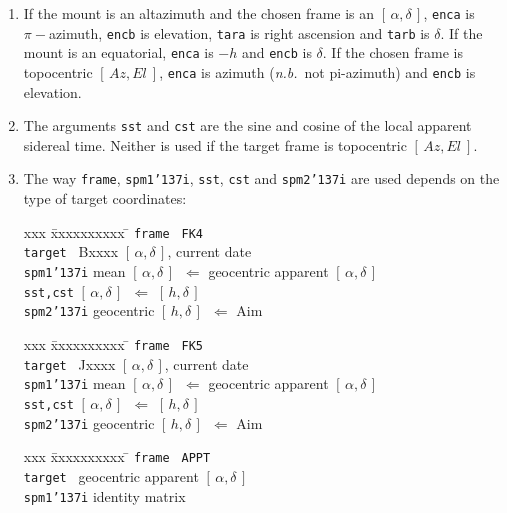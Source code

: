 \documentclass[12pt,fleqn,twoside]{article}
\renewcommand{\_}{{\tt\char'137}}     %
\newcommand{\radec}     {$[\,\alpha,\delta\,]$}
\newcommand{\hadec}     {$[\,h,\delta\,]$}
\newcommand{\azel}      {$[\,Az,El~]$}
\begin{document}
{\begin{enumerate}
      In the present case, the sky coordinates are predicted, starting
      from the mount's encoder readings.
\item If the mount is an altazimuth and the chosen frame is an
      \radec, {\tt enca} is $\pi-$azimuth, {\tt encb} is
      elevation, {\tt tara} is right
      ascension and {\tt tarb} is $\delta$.  If the mount is an
      equatorial, {\tt enca} is $-h$ and {\tt encb} is
      $\delta$.  If the chosen
      frame is topocentric \azel, {\tt enca} is azimuth
      ({\it n.b.}~not pi-azimuth) and {\tt encb} is elevation.
\item The arguments {\tt sst} and {\tt cst} are the
      sine and cosine of the local
      apparent sidereal time.  Neither is used if the target frame is
      topocentric \azel.
\item The way {\tt frame}, {\tt spm1\_i}, {\tt sst}, {\tt cst} and
      {\tt spm2\_i} are used depends on the type of target coordinates:
      \begin{tabbing}
         xxx \= xxxxxxxxxx \= \kill
         \> {\tt frame  } \> {\tt FK4} \\
         \> {\tt target } \> Bxxxx \radec, current date \\
         \> {\tt spm1\_i} \>
                 mean \radec\ $\Leftarrow$ geocentric apparent \radec \\
         \> {\tt sst,cst} \> \radec\ $\Leftarrow$ \hadec \\
         \> {\tt spm2\_i} \>  geocentric \hadec\ $\Leftarrow$ {\sc Aim}
      \end{tabbing}
      \begin{tabbing}
         xxx \= xxxxxxxxxx \= \kill
         \> {\tt frame  } \> {\tt FK5} \\
         \> {\tt target } \> Jxxxx \radec, current date \\
         \> {\tt spm1\_i} \>
                 mean \radec\ $\Leftarrow$ geocentric apparent \radec \\
         \> {\tt sst,cst} \> \radec\ $\Leftarrow$ \hadec \\
         \> {\tt spm2\_i} \> geocentric \hadec\ $\Leftarrow$ {\sc Aim}
      \end{tabbing}
      \begin{tabbing}
         xxx \= xxxxxxxxxx \= \kill
         \> {\tt frame  } \> {\tt APPT} \\
         \> {\tt target } \> geocentric apparent \radec \\
         \> {\tt spm1\_i} \> identity matrix \\

\end{tabbing}
\end{enumerate}}
\end{document}
